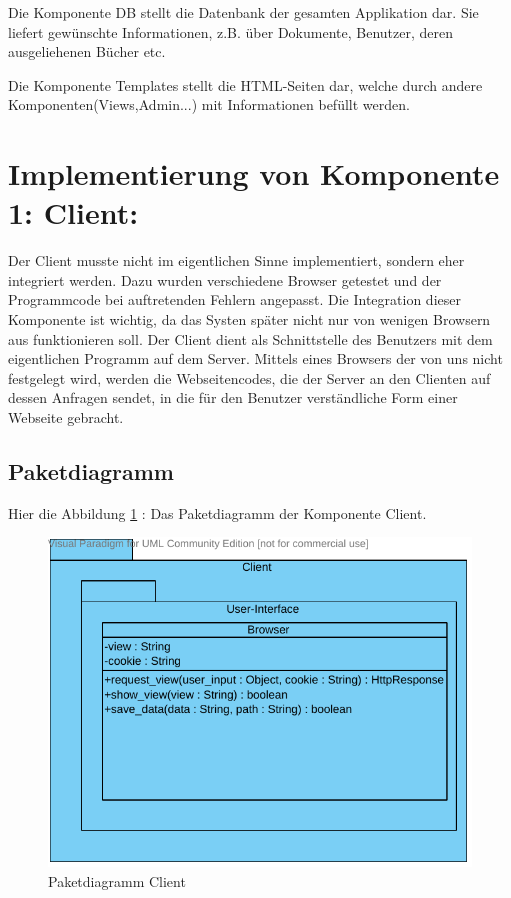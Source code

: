 Die Komponente DB stellt die Datenbank der gesamten Applikation dar.
Sie liefert gewünschte Informationen, z.B. über Dokumente, Benutzer, deren 
ausgeliehenen Bücher etc.

Die Komponente Templates stellt die HTML-Seiten dar, welche durch andere 
Komponenten(Views,Admin...) mit Informationen befüllt werden.    



\section{Implementierung von Komponente
         1: Client:}


Der Client musste nicht im eigentlichen Sinne implementiert, sondern eher
integriert werden. Dazu wurden verschiedene Browser getestet und der
Programmcode bei auftretenden Fehlern angepasst. Die Integration dieser
Komponente ist wichtig, da das Systen später nicht nur von wenigen Browsern aus
funktionieren soll.
Der Client dient als Schnittstelle des Benutzers mit dem eigentlichen Programm
auf dem Server. Mittels eines Browsers der von uns nicht festgelegt wird, werden
die Webseitencodes, die der Server an den Clienten auf dessen Anfragen sendet,
in die für den Benutzer verständliche Form einer Webseite gebracht.

\subsection{Paketdiagramm}
Hier die Abbildung \ref{fig:PDclient} : Das Paketdiagramm der Komponente Client.
\begin{figure}[!htb]
\includegraphics[width=0.8\linewidth]{bilder/Paketdiagramm_client.pdf}
\caption{Paketdiagramm Client}
\label{fig:PDclient}
\end{figure}
